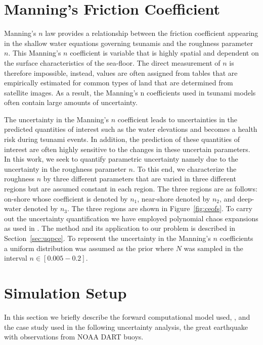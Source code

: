 \section{Manning’s Friction Coefficient}

Manning's $n$ law provides a relationship between the friction coefficient appearing in the shallow
water equations governing tsunamis and the roughness parameter $n$. 
This Manning's $n$ coefficient is variable that is highly spatial 
and dependent on the surface characteristics of the sea-floor. 
The direct measurement of $n$ is therefore impossible, instead, values
are often assigned from tables that are empirically estimated
for common types of land that are determined from satellite images.
As a result, the Manning’s n coefficients used in tsunami models
often contain large amounts of uncertainty.

The uncertainty in the Manning's $n$ coefficient leads to uncertainties
in the predicted quantities of interest such as the water elevations
and becomes a health risk during tsunami events. In addition, 
the prediction of these quantities of interest are often highly sensitive to 
the changes in these uncertain parameters. 
In this work, we seek to quantify parametric uncertainty namely due 
to the uncertainty in the roughness parameter $n$. To this end,
we characterize the roughness $n$ by three different parameters
that are varied in three different regions but are assumed
constant in each region. The three regions are as follows: 
on-shore whose coefficient is denoted by $n_1$, near-shore 
denoted by $n_2$, and deep-water denoted by $n_3$.
The three regions are shown in Figure~\ref{fig:ceofs}.
To carry out the uncertainty quantification we have employed polynomial chaos expansions 
as used in \cite{sraj:2013a,sraj:2013b}. The method and its application
to our problem is described in Section~\ref{sec:uqpce}.  
To represent the uncertainty in the Manning's $n$ coefficients a uniform distribution was assumed as the prior where $N$ was sampled in the interval $n \in [0.005-0.2]$.  

\section{Simulation Setup}

In this section we briefly describe the forward computational model used, \geoclaw, and the case study used in the following uncertainty analysis, the great \tohoku earthquake with observations from NOAA DART buoys.

